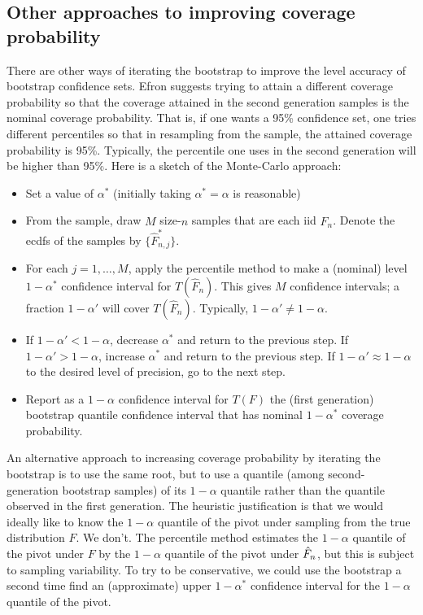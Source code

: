 \subsection{Other approaches to improving coverage probability }
There are other ways of iterating the bootstrap to improve the level accuracy of
bootstrap confidence sets.
Efron suggests trying to attain a different coverage probability so that
the coverage attained in the second generation samples is the nominal coverage probability.
That is, if one wants a 95\% confidence set, one tries different percentiles so that in
resampling from the sample, the attained coverage probability is 95\%.  Typically, the
percentile one uses in the second generation will be higher than 95\%.
Here is a sketch of the Monte-Carlo approach:
\begin{itemize}
    \item
        Set a value of $\alpha^*$ (initially taking $\alpha^* = \alpha$ is reasonable)
    \item
        From the sample, draw $M$ size-$n$ samples that are each iid
        $\hat{F}_n$. Denote the ecdfs of the samples by $\{ \hat{F}_{n,j}^*\}$.
    \item
        For each $j = 1, \ldots, M$, apply the percentile method to make a (nominal) level
        $1-\alpha^*$ confidence
        interval for $T(\hat{F}_n)$.
        This gives $M$ confidence intervals; a fraction $1-\alpha'$ will cover
        $T(\hat{F}_n)$. Typically,
        $1- \alpha' \ne 1-\alpha$.
    \item
        If $1-\alpha' < 1 - \alpha$, decrease $\alpha^*$ and return to the previous step.
        If $1-\alpha' > 1 - \alpha$, increase $\alpha^*$ and return to the previous step.
        If $1-\alpha' \approx 1-\alpha$ to the desired level of precision, go to the next
        step.
    \item
        Report as a $1-\alpha$ confidence interval for $T(F)$ the (first generation)
        bootstrap quantile confidence interval
        that has nominal $1 - \alpha^*$ coverage probability.
\end{itemize}

An alternative approach to increasing coverage probability by iterating
the bootstrap is to use the same root, but to use a quantile
(among second-generation bootstrap samples) of
its $1-\alpha$ quantile rather than  the quantile observed in the first generation.
The heuristic justification is that we would ideally like to know the $1-\alpha$ quantile
of the pivot under sampling from the true distribution $F$.
We don't.
The percentile method estimates the $1-\alpha$ quantile of the pivot under $F$ by the
$1-\alpha$ quantile of the pivot under ${\hat{F}_n}$, but this is subject to sampling variability.
To try to be conservative, we could use the bootstrap a second time  find an (approximate)
upper
$1-\alpha^*$ confidence interval for the $1-\alpha$ quantile of the pivot.


